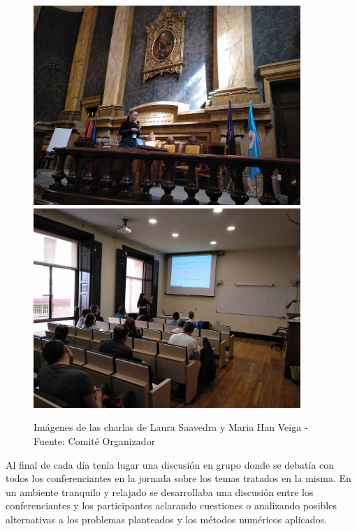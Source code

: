 \documentclass[twoside]{article}
\begin{document}
\begin{center}
\begin{figure}
	\centering
		\includegraphics[width=0.9\textwidth]{Laura_Saavedra}
		\includegraphics[width=0.9\textwidth]{Maria_Han}
	\label{fig:Salon5}
	\caption{Imágenes de las charlas de Laura Saavedra y Maria Han Veiga  - Fuente: Comité Organizador}
\end{figure}
\end{center}
%
Al final de cada día tenía lugar una discusión en grupo donde se debatía con todos los conferenciantes en la jornada sobre los temas tratados en la misma. En un ambiente tranquilo y relajado se desarrollaba una discusión entre los conferenciantes y los participantes aclarando cuestiones o analizando posibles alternativas a los problemas planteados y los métodos numéricos aplicados.
%
\end{document}

